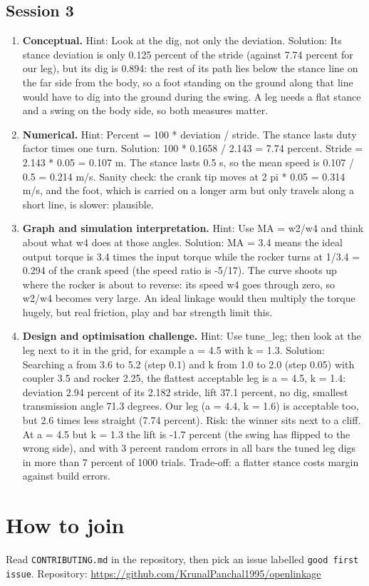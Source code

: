 \documentclass[11pt,a4paper]{article}
\begin{document}
\subsection*{Session 3}
\begin{enumerate}[nosep]
\item \textbf{Conceptual.} Hint: Look at the dig, not only the deviation. Solution: Its stance deviation is only 0.125 percent of the stride (against 7.74 percent for our leg), but its dig is 0.894: the rest of its path lies below the stance line on the far side from the body, so a foot standing on the ground along that line would have to dig into the ground during the swing. A leg needs a flat stance and a swing on the body side, so both measures matter.
\item \textbf{Numerical.} Hint: Percent = 100 * deviation / stride. The stance lasts duty factor times one turn. Solution: 100 * 0.1658 / 2.143 = 7.74 percent. Stride = 2.143 * 0.05 = 0.107 m. The stance lasts 0.5 s, so the mean speed is 0.107 / 0.5 = 0.214 m/s. Sanity check: the crank tip moves at 2 pi * 0.05 = 0.314 m/s, and the foot, which is carried on a longer arm but only travels along a short line, is slower: plausible.
\item \textbf{Graph and simulation interpretation.} Hint: Use MA = w2/w4 and think about what w4 does at those angles. Solution: MA = 3.4 means the ideal output torque is 3.4 times the input torque while the rocker turns at 1/3.4 = 0.294 of the crank speed (the speed ratio is -5/17). The curve shoots up where the rocker is about to reverse: its speed w4 goes through zero, so w2/w4 becomes very large. An ideal linkage would then multiply the torque hugely, but real friction, play and bar strength limit this.
\item \textbf{Design and optimisation challenge.} Hint: Use tune\_leg; then look at the leg next to it in the grid, for example a = 4.5 with k = 1.3. Solution: Searching a from 3.6 to 5.2 (step 0.1) and k from 1.0 to 2.0 (step 0.05) with coupler 3.5 and rocker 2.25, the flattest acceptable leg is a = 4.5, k = 1.4: deviation 2.94 percent of its 2.182 stride, lift 37.1 percent, no dig, smallest transmission angle 71.3 degrees. Our leg (a = 4.4, k = 1.6) is acceptable too, but 2.6 times less straight (7.74 percent). Risk: the winner sits next to a cliff. At a = 4.5 but k = 1.3 the lift is -1.7 percent (the swing has flipped to the wrong side), and with 3 percent random errors in all bars the tuned leg digs in more than 7 percent of 1000 trials. Trade-off: a flatter stance costs margin against build errors.
\end{enumerate}

\section{How to join}
Read \texttt{CONTRIBUTING.md} in the repository, then pick an issue labelled \texttt{good first issue}. Repository: \url{https://github.com/KrunalPanchal1995/openlinkage}
\end{document}
